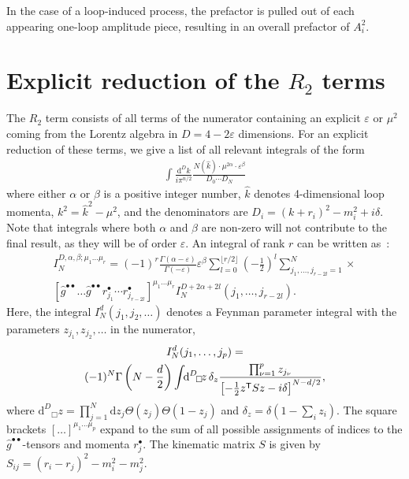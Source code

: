 \documentclass[11pt,a4paper]{refrep}
\newcommand{\diff}[1][{}]{{\mathrm{d}}^{#1}\!}
\begin{document}
In the case of a loop-induced process, the prefactor is pulled out of each appearing one-loop amplitude piece, resulting in an overall prefactor of $A_i^2$.

\chapter{Explicit reduction of the $R_2$ terms}\label{app:r2}
The $R_2$ term \cite{Ossola:2008xq} consists of all terms of the numerator
containing an explicit $\varepsilon$ or $\mu^2$ coming from the Lorentz
algebra in $D=4-2\varepsilon$ dimensions. 
For an explicit reduction of these terms, we give a list of all relevant integrals of the form
\begin{align}
\int\frac{\diff[D] k}{i\pi^{n/2}}
\frac{N(\hat{k})\cdot\mu^{2\alpha}\cdot\varepsilon^\beta}{D_0\cdots D_N}
\end{align}
where either $\alpha$ or $\beta$ is a positive integer number, 
$\hat{k}$ denotes 4-dimensional loop momenta, $k^2=\hat{k}^2-\mu^2$, 
and the denominators are $D_i=(k+r_i)^2-m_i^2+i\delta$.
Note that integrals where both $\alpha$ and $\beta$ are
non-zero will not contribute to the final result, as they will be of order $\varepsilon$.
An integral of rank $r$ 
can be written as~\cite{Binoth:2005ff,Reiter:2009kb}:
\begin{multline}
I_N^{D,\alpha,\beta;\mu_1\ldots\mu_r}=
(-1)^{r}\frac{\Gamma(\alpha-\varepsilon)}{\Gamma(-\varepsilon)}
\varepsilon^\beta
\sum_{l=0}^{\lfloor r/2\rfloor}\left(-\frac12\right)^l
\sum_{j_1,\ldots,j_{r-2l}=1}^N
\times\\
\left[\hat{g}^{\bullet\bullet}\ldots
\hat{g}^{\bullet\bullet}r_{j_1}^\bullet
\cdots r_{j_{r-2l}}^\bullet\right]^{\mu_1\ldots\mu_r}
I_N^{D+2\alpha+2l}(j_1,\ldots,j_{r-2l}).
\end{multline}
Here, the integral $I_N^d(j_1,j_2,\ldots)$ denotes a Feynman parameter
integral with the parameters $z_{j_1}, z_{j_2}, \ldots$ in the numerator,
\begin{multline}
I_N^d(j_1,\ldots, j_p)=\\
(-1)^N\Gamma\left(N-\frac{d}2\right)%
\int\!\!\diff[D]_\Box\!z\,\delta_z
\frac{\prod_{\nu=1}^p z_{j_\nu}}{%
\left[-\frac12 z^{\mathsf{T}}Sz-i\delta\right]^{N-d/2}},
\end{multline}
where $\diff[D]_\Box\!z=
\prod_{j=1}^N\mathrm{d}z_j\Theta(z_j)\Theta(1-z_j)$
and $\delta_z=\delta(1-\sum_i z_i)$.
The square brackets $[\ldots]^{\mu_1\ldots\mu_p}$ expand to the sum of
all possible assignments of indices to the $\hat{g}^{\bullet\bullet}$-tensors
and momenta $r_j^\bullet$. 
The kinematic matrix $S$ is given by $S_{ij}=(r_i-r_j)^2-m_i^2-m_j^2$.
\end{document}
